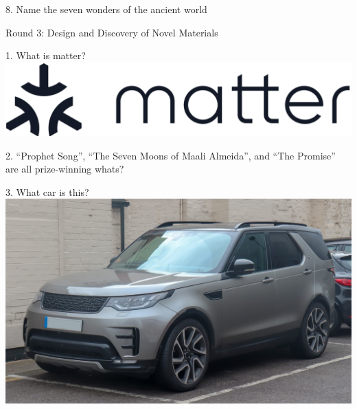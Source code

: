 \begin{frame}
\begin{center}
\Large
8. Name the seven wonders of the ancient world
\\
\end{center}
\end{frame}
\begin{frame}
\begin{center}
\Huge
Round 3: Design and Discovery of Novel Materials
\end{center}
\end{frame}
\begin{frame}
\begin{center}
\Large
1. What is matter?
\\
\vspace{0.5em}\includegraphics[height=0.25\paperheight]{images/matter.png}
\end{center}
\end{frame}
\begin{frame}
\begin{center}
\Large
2. ``Prophet Song'', ``The Seven Moons of Maali Almeida'', and ``The Promise'' are all prize-winning whats?
\end{center}
\end{frame}
\begin{frame}
\begin{center}
\Large
3. What car is this?
\\
\vspace{0.5em}\includegraphics[height=0.6\paperheight]{images/land_rover_discovery.jpg}
\end{center}
\end{frame}
